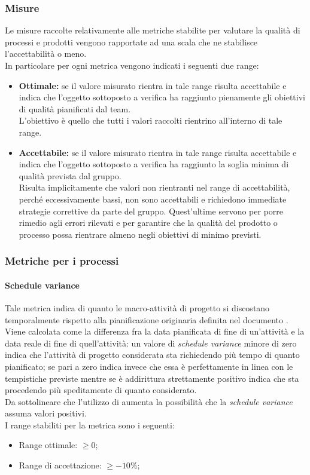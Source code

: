 		\subsubsection{Misure}
		Le misure raccolte relativamente alle metriche stabilite per valutare la qualità di processi e prodotti vengono rapportate ad una scala che ne stabilisce l'accettabilità o meno. \\In particolare per ogni metrica vengono indicati i seguenti due range:
			\begin{itemize}
				\item \textbf{Ottimale:} se il valore misurato rientra in tale range risulta accettabile e indica che l'oggetto sottoposto a verifica ha raggiunto pienamente gli obiettivi di qualità pianificati dal team. \\L'obiettivo è quello che tutti i valori raccolti rientrino all'interno di tale range.
				\item \textbf{Accettabile:} se il valore misurato rientra in tale range risulta accettabile e indica che l'oggetto sottoposto a verifica ha raggiunto la soglia minima di qualità prevista dal gruppo.
			\\Risulta implicitamente che valori non rientranti nel range di accettabilità, perché eccessivamente bassi, non sono accettabili e richiedono immediate strategie correttive da parte del gruppo. Quest'ultime servono per porre rimedio agli errori rilevati e per garantire che la qualità del prodotto o processo possa rientrare almeno negli obiettivi di minimo previsti.		
			\end{itemize}
	

		\subsubsection{Metriche per i processi}
			\paragraph{Schedule variance}
			Tale metrica indica di quanto le macro-attività di progetto si discostano temporalmente rispetto alla pianificazione originaria definita nel documento \PdP . 
			\\Viene calcolata come la
differenza fra la data pianificata di fine di un’attività e la data
reale di fine di quell’attività: un valore di \textit{schedule variance} minore di zero indica che l'attività di progetto considerata sta richiedendo più tempo di quanto pianificato; se pari a zero indica invece che essa è perfettamente in linea con le tempistiche previste mentre se è addirittura strettamente positivo indica che sta procedendo più speditamente di quanto considerato. 
			\\Da sottolineare che l'utilizzo di  aumenta la possibilità che la \textit{schedule variance} assuma valori positivi.
			\\I range stabiliti per la metrica sono i seguenti:
				\begin{itemize}
					\item Range ottimale: $\geq{0}$;
					\item Range di accettazione: $\geq{-10}$\%;
				\end{itemize}

